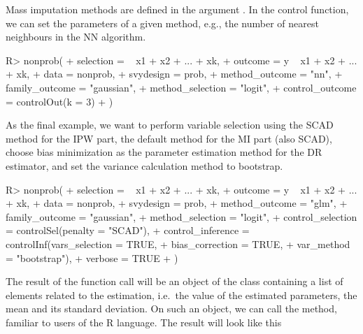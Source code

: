 \documentclass[
]{jss}
\begin{document}
Mass imputation methods are defined in the argument
. In the control function, we can set the
parameters of a given method, e.g., the number of nearest neighbours in
the NN algorithm.

\begin{CodeChunk}
\begin{CodeInput}
R> nonprob(
+   selection = ~ x1 + x2 + ... + xk, 
+   outcome = y ~ x1 + x2 + ... + xk, 
+   data = nonprob, 
+   svydesign = prob, 
+   method_outcome = "nn",
+   family_outcome = "gaussian",
+   method_selection = "logit",
+   control_outcome = controlOut(k = 3)
+ )
\end{CodeInput}
\end{CodeChunk}

As the final example, we want to perform variable selection using the
SCAD method for the IPW part, the default method for the MI part (also
SCAD), choose bias minimization as the parameter estimation method for
the DR estimator, and set the variance calculation method to bootstrap.

\begin{CodeChunk}
\begin{CodeInput}
R> nonprob(
+   selection = ~ x1 + x2 + ... + xk, 
+   outcome = y ~ x1 + x2 + ... + xk, 
+   data = nonprob, 
+   svydesign = prob, 
+   method_outcome = "glm", 
+   family_outcome = "gaussian",
+   method_selection = "logit",
+   control_selection = controlSel(penalty = "SCAD"),
+   control_inference = controlInf(vars_selection = TRUE,
+                                  bias_correction = TRUE,
+                                  var_method = "bootstrap"),
+   verbose = TRUE
+ )
\end{CodeInput}
\end{CodeChunk}

The result of the function call will be an object of the class
 containing a list of elements related to the
estimation, i.e.~the value of the estimated parameters, the mean and its
standard deviation. On such an object, we can call the 
method, familiar to users of the R language. The result will look like
this
\end{document}
